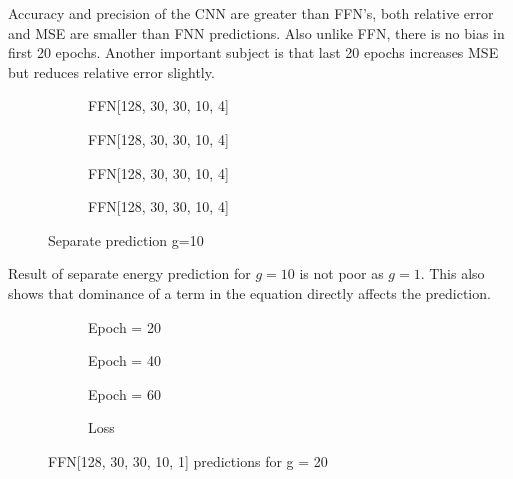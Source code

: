 \documentclass[a4paper,times,12pt]{article}
\begin{document}
Accuracy and precision of the CNN are greater than FFN's, both relative error and MSE are smaller than FNN predictions. Also unlike FFN, there is no bias in first 20 epochs. Another important subject is that last 20 epochs increases MSE but reduces relative error slightly. 

\begin{figure}[H]
    \centering
    \begin{subfigure}[t]{0.45\textwidth}
		\centering
        
        \caption{FFN[128, 30, 30, 10, 4]}
		\label{fig:a}
    \end{subfigure}
    \begin{subfigure}[t]{0.45\textwidth}
		\centering
        
        \caption{FFN[128, 30, 30, 10, 4]}
		\label{fig:b}
    \end{subfigure}    
    \begin{subfigure}[t]{0.45\textwidth}
        \centering
        
        \caption{FFN[128, 30, 30, 10, 4]}
		\label{fig:c}
    \end{subfigure}
    \begin{subfigure}[t]{0.45\textwidth}
        \centering
        
        \caption{FFN[128, 30, 30, 10, 4]}
		\label{fig:c}
    \end{subfigure}
	\caption{Separate prediction  g=10}
\label{fig:FFN-g-10-S}
\end{figure}

Result of separate energy prediction for $g=10$ is not poor as $g = 1$. This also shows that dominance of a term in the equation directly affects the prediction. 

\begin{figure}[H]
    \centering
    \begin{subfigure}[t]{0.45\textwidth}
		\centering
        
        \caption{Epoch = 20}
		\label{fig:a}
    \end{subfigure}
    \begin{subfigure}[t]{0.45\textwidth}
		\centering
        
        \caption{Epoch = 40}
		\label{fig:b}
    \end{subfigure}    
    \begin{subfigure}[t]{0.45\textwidth}
        \centering
        
        \caption{Epoch = 60}
		\label{fig:c}
    \end{subfigure}
    \begin{subfigure}[t]{0.45\textwidth}
        \centering
        
        \caption{Loss}
		\label{fig:c}
    \end{subfigure}
	\caption{FFN[128, 30, 30, 10, 1] predictions for g = 20}
\label{fig:FFN-g-20}
\end{figure}
\end{document}
